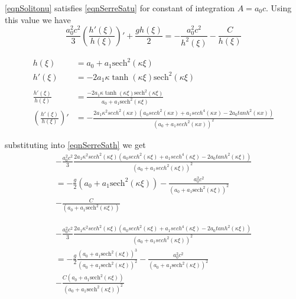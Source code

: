 \documentclass[subeqn]{article}
\begin{document}
\eqref{eqnSolitonu} satisfies \eqref{eqnSerreSatu} for constant of integration $A = a_0 c$. Using this value we have 
\[\frac{a_0^2 c^2}{3} \left(\frac{h'(\xi)}{h(\xi)} \right)' + \frac{gh(\xi)}{2}   =  -\frac{a_0^2 c^2}{h^2(\xi)} - \frac{C}{h(\xi)}\]

\begin{align*}
h(\xi) &= a_0 + a_1\text{sech}^2\left( \kappa \xi\right) \\
h'(\xi) &= -2 a_1 \kappa\tanh\left(\kappa \xi \right) \text{sech}^2\left( \kappa \xi\right) \\ \\
\frac{h'(\xi)}{h(\xi)} &= \frac{-2 a_1 \kappa\tanh\left(\kappa \xi \right) \text{sech}^2\left( \kappa \xi\right)}{a_0 + a_1\text{sech}^2\left( \kappa \xi\right)} \\
\left(\frac{h'(\xi)}{h(\xi)}\right)' &= -\frac{2 a_1 \kappa^2 sech^2(\kappa x) \left(a_0 sech^2(\kappa x) + a_1 sech^4(\kappa x) - 2 a_0 tanh^2(\kappa x) \right)}{(a_0 + a_1 sech^2(\kappa x))^2}
\end{align*}

substituting into  \eqref{eqnSerreSath} we get
\begin{multline*}
- \frac{a_0^2 c^2}{3}\frac{2 a_1 \kappa^2 sech^2(\kappa \xi) \left(a_0 sech^2(\kappa \xi) + a_1 sech^4(\kappa \xi) - 2 a_0 tanh^2(\kappa \xi) \right)}{(a_0 + a_1 sech^2(\kappa \xi))^2} \\
 = -\frac{g}{2}\left(a_0 + a_1\text{sech}^2\left( \kappa \xi\right) \right) - \frac{a_0^2c^2}{\left(a_0 + a_1\text{sech}^2\left( \kappa \xi\right) \right)^2} \\
- \frac{C}{\left(a_0 + a_1\text{sech}^2\left( \kappa \xi\right) \right)}
\end{multline*}

\begin{multline*}
- \frac{a_0^2 c^2}{3}\frac{2 a_1 \kappa^2 sech^2(\kappa \xi) \left(a_0 sech^2(\kappa \xi) + a_1 sech^4(\kappa \xi) - 2 a_0 tanh^2(\kappa \xi) \right)}{(a_0 + a_1 sech^2(\kappa \xi))^2} \\
= -\frac{g}{2}\frac{\left(a_0 + a_1\text{sech}^2\left( \kappa \xi\right) \right)^3 }{\left(a_0 + a_1\text{sech}^2\left( \kappa \xi\right) \right) ^2} - \frac{a_0^2c^2}{\left(a_0 + a_1\text{sech}^2\left( \kappa \xi\right) \right)^2} \\
- \frac{C\left(a_0 + a_1\text{sech}^2\left( \kappa \xi\right) \right) }{\left(a_0 + a_1\text{sech}^2\left( \kappa \xi\right) \right)^2}
\end{multline*}
\end{document}
